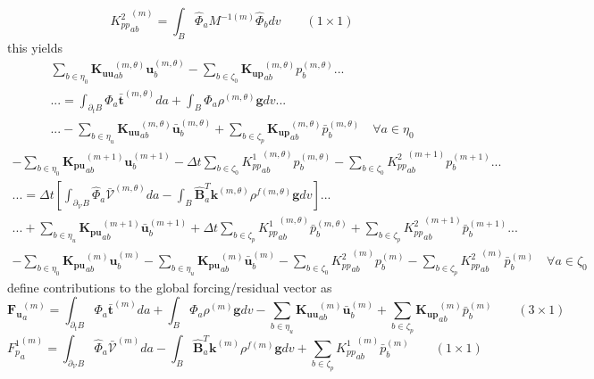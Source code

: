 \documentclass[11pt]{article} %
\begin{document}
\begin{equation}
	{K^2_{pp}}_{ab}^{(m)} = \int_B \hat{\Phi}_a M^{-1 (m)} \hat{\Phi}_b dv \qquad ( 1 \times 1 )
\end{equation}
this yields
\begin{eqnarray}
	 \sum_{b \in \eta_0} \mathbf{K_{uu}}_{ab}^{(m,\theta)} \mathbf{u}_b^{(m,\theta)} - \sum_{b \in \zeta_0} \mathbf{K_{up}}_{ab}^{(m,\theta)} p_b^{(m,\theta)}  ... \nonumber \\
	... = \int_{\partial_t B} \Phi_a \bar{\mathbf{t}}^{(m,\theta)} da + \int_B \Phi_a \rho^{(m,\theta)} \mathbf{g} dv ... \nonumber \\
	... - \sum_{b \in \eta_u} \mathbf{K_{uu}}_{ab}^{(m,\theta)} \bar{\mathbf{u}}_b^{(m,\theta)} + \sum_{b \in \zeta_p}\mathbf{K_{up}}_{ab}^{(m,\theta)} \bar{p}_b^{(m,\theta)} \quad \forall a \in \eta_0
\end{eqnarray}
\begin{eqnarray}
	 - \sum_{b \in \eta_0} \mathbf{K_{pu}}_{ab}^{(m+1)} \mathbf{u}_b^{(m+1)} - \Delta t \sum_{b \in \zeta_0} {K^1_{pp}}_{ab}^{(m, \theta)} p_b^{(m,\theta)} - \sum_{b \in \zeta_0} {K^2_{pp}}_{ab}^{(m+1)} p_b^{(m+1)}  ... \nonumber \\
	... = \Delta t \left[ \int_{\partial_{\mathcal{V}} B} \hat{\Phi}_a \bar{\mathcal{V}}^{(m,\theta)} da - \int_B \hat{\mathbf{B}}_a^T \mathbf{k}^{(m,\theta)} \rho^{f (m,\theta)} \mathbf{g} dv \right] ... \nonumber \\
	... + \sum_{b \in \eta_u} \mathbf{K_{pu}}_{ab}^{(m+1)} \bar{\mathbf{u}}_b^{(m+1)} + \Delta t \sum_{b \in \zeta_p} {K^1_{pp}}_{ab}^{(m, \theta)} \bar{p}_b^{(m,\theta)} + \sum_{b \in \zeta_p} {K^2_{pp}}_{ab}^{(m+1)} \bar{p}_b^{(m+1)} ... \nonumber \\
	- \sum_{b \in \eta_0} \mathbf{K_{pu}}_{ab}^{(m)} \mathbf{u}_b^{(m)} - \sum_{b \in \eta_u} \mathbf{K_{pu}}_{ab}^{(m)} \bar{\mathbf{u}}_b^{(m)} - \sum_{b \in \zeta_0} {K^2_{pp}}_{ab}^{(m)} p_b^{(m)} - \sum_{b \in \zeta_p} {K^2_{pp}}_{ab}^{(m)} \bar{p}_b^{(m)} \quad \forall a \in \zeta_0
\end{eqnarray}
define contributions to the global forcing/residual vector as
\begin{equation}
	\mathbf{F_{u}}_{a}^{(m)} = \int_{\partial_t B} \Phi_a \bar{\mathbf{t}}^{(m)} da + \int_B \Phi_a \rho^{(m)} \mathbf{g} dv - \sum_{b \in \eta_u} \mathbf{K_{uu}}_{ab}^{(m)} \bar{\mathbf{u}}_b^{(m)} + \sum_{b \in \zeta_p}\mathbf{K_{up}}_{ab}^{(m)} \bar{p}_b^{(m)} \qquad ( 3 \times 1 )
\end{equation}
\begin{equation}
	{F^1_{p}}_{a}^{(m)} = \int_{\partial_{\mathcal{V}} B} \hat{\Phi}_a \bar{\mathcal{V}}^{(m)} da - \int_B \hat{\mathbf{B}}_a^T \mathbf{k}^{(m)} \rho^{f (m)} \mathbf{g} dv + \sum_{b \in \zeta_p} {K^1_{pp}}_{ab}^{(m)} \bar{p}_b^{(m)} \qquad ( 1 \times 1 )
\end{equation}
\end{document}
